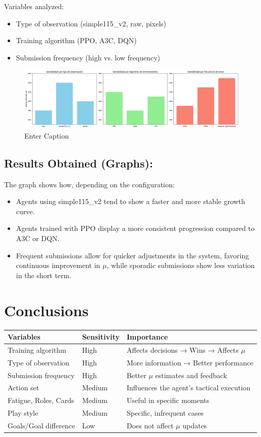 Variables analyzed:
\begin{itemize}
    \item Type of observation (simple115\_v2, raw, pixels)
    \item Training algorithm (PPO, A3C, DQN)
    \item Submission frequency (high vs. low frequency)
\end{itemize}

\begin{figure}
    \centering
    \includegraphics[width=\linewidth]{grafe} 
    \caption{Enter Caption}
    \label{fig:enter-label}
\end{figure}


\subsection*{Results Obtained (Graphs):}
The graph shows how, depending on the configuration:
\begin{itemize}
    \item Agents using simple115\_v2 tend to show a faster and more stable growth curve.
    \item Agents trained with PPO display a more consistent progression compared to A3C or DQN.
    \item Frequent submissions allow for quicker adjustments in the system, favoring continuous improvement in $\mu$, while sporadic submissions show less variation in the short term.
\end{itemize}

\section*{Conclusions}

\begin{tabular}{|l|l|l|}
\hline
Variables & Sensitivity & Importance \\
\hline
Training algorithm & High & Affects decisions → Wins → Affects $\mu$ \\
Type of observation & High & More information → Better performance \\
Submission frequency & High & Better $\mu$ estimates and feedback \\
Action set & Medium & Influences the agent’s tactical execution \\
Fatigue, Roles, Cards & Medium & Useful in specific moments \\
Play style & Medium & Specific, infrequent cases \\
Goals/Goal difference & Low & Does not affect $\mu$ updates \\
\hline
\end{tabular}
